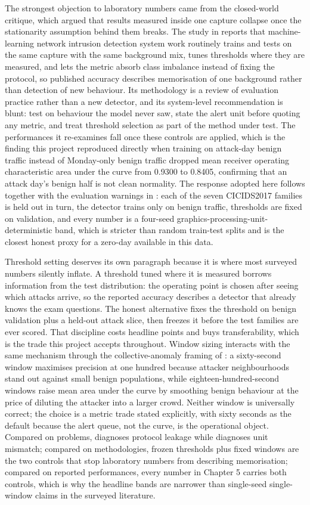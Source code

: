 The strongest objection to laboratory numbers came from the closed-world critique, which argued that results measured inside one capture collapse once the stationarity assumption behind them breaks. The study in \cite{k4} reports that machine-learning network intrusion detection system work routinely trains and tests on the same capture with the same background mix, tunes thresholds where they are measured, and lets the metric absorb class imbalance instead of fixing the protocol, so published accuracy describes memorisation of one background rather than detection of new behaviour. Its methodology is a review of evaluation practice rather than a new detector, and its system-level recommendation is blunt: test on behaviour the model never saw, state the alert unit before quoting any metric, and treat threshold selection as part of the method under test. The performances it re-examines fall once these controls are applied, which is the finding this project reproduced directly when training on attack-day benign traffic instead of Monday-only benign traffic dropped mean receiver operating characteristic area under the curve from 0.9300 to 0.8405, confirming that an attack day's benign half is not clean normality. The response adopted here follows \cite{k4} together with the evaluation warnings in \cite{k3}: each of the seven CICIDS2017 families is held out in turn, the detector trains only on benign traffic, thresholds are fixed on validation, and every number is a four-seed graphics-processing-unit-deterministic band, which is stricter than random train-test splits and is the closest honest proxy for a zero-day available in this data.

Threshold setting deserves its own paragraph because it is where most surveyed numbers silently inflate. A threshold tuned where it is measured borrows information from the test distribution: the operating point is chosen after seeing which attacks arrive, so the reported accuracy describes a detector that already knows the exam questions. The honest alternative fixes the threshold on benign validation plus a held-out attack slice, then freezes it before the test families are ever scored. That discipline costs headline points and buys transferability, which is the trade this project accepts throughout. Window sizing interacts with the same mechanism through the collective-anomaly framing of \cite{k3}: a sixty-second window maximises precision at one hundred because attacker neighbourhoods stand out against small benign populations, while eighteen-hundred-second windows raise mean area under the curve by smoothing benign behaviour at the price of diluting the attacker into a larger crowd. Neither window is universally correct; the choice is a metric trade stated explicitly, with sixty seconds as the default because the alert queue, not the curve, is the operational object. Compared on problems, \cite{k4} diagnoses protocol leakage while \cite{k3} diagnoses unit mismatch; compared on methodologies, frozen thresholds plus fixed windows are the two controls that stop laboratory numbers from describing memorisation; compared on reported performances, every number in Chapter 5 carries both controls, which is why the headline bands are narrower than single-seed single-window claims in the surveyed literature.

